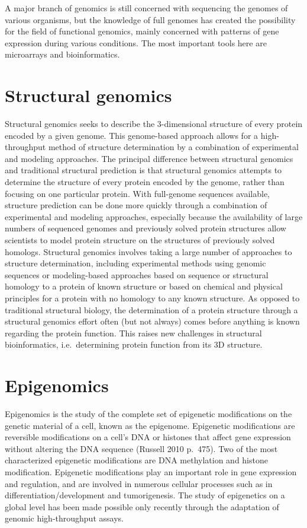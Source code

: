 A major branch of genomics is still concerned with sequencing the genomes of various organisms, but the knowledge of full genomes has created the possibility for the field of functional genomics, mainly concerned with patterns of gene expression during various conditions. The most important tools here are microarrays and bioinformatics.

\hypertarget{structural-genomics}{%
\section{Structural genomics}\label{structural-genomics}}

Structural genomics seeks to describe the 3-dimensional structure of every protein encoded by a given genome. This genome-based approach allows for a high-throughput method of structure determination by a combination of experimental and modeling approaches. The principal difference between structural genomics and traditional structural prediction is that structural genomics attempts to determine the structure of every protein encoded by the genome, rather than focusing on one particular protein. With full-genome sequences available, structure prediction can be done more quickly through a combination of experimental and modeling approaches, especially because the availability of large numbers of sequenced genomes and previously solved protein structures allow scientists to model protein structure on the structures of previously solved homologs. Structural genomics involves taking a large number of approaches to structure determination, including experimental methods using genomic sequences or modeling-based approaches based on sequence or structural homology to a protein of known structure or based on chemical and physical principles for a protein with no homology to any known structure. As opposed to traditional structural biology, the determination of a protein structure through a structural genomics effort often (but not always) comes before anything is known regarding the protein function. This raises new challenges in structural bioinformatics, i.e.~determining protein function from its 3D structure.

\hypertarget{epigenomics}{%
\section{Epigenomics}\label{epigenomics}}

Epigenomics is the study of the complete set of epigenetic modifications on the genetic material of a cell, known as the epigenome. Epigenetic modifications are reversible modifications on a cell's DNA or histones that affect gene expression without altering the DNA sequence (Russell 2010 p.~475). Two of the most characterized epigenetic modifications are DNA methylation and histone modification. Epigenetic modifications play an important role in gene expression and regulation, and are involved in numerous cellular processes such as in differentiation/development and tumorigenesis. The study of epigenetics on a global level has been made possible only recently through the adaptation of genomic high-throughput assays.

